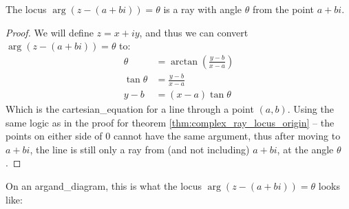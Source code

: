             \begin{theorem}
                The \gls{locus} $\arg (z-(a+bi))=\theta$ is a ray with angle $\theta$ from the point $a+bi$.
            \end{theorem}
            \begin{proof}
                We will define $z=x+iy$, and thus we can convert $\arg(z-(a+bi))=\theta$ to:
                \begin{equation*}
                    \begin{aligned}
                        \theta&=\arctan\left(\frac{y-b}{x-a}\right) \\
                        \tan\theta&=\frac{y-b}{x-a} \\
                        y-b&=(x-a)\tan\theta
                    \end{aligned}
                \end{equation*}
                Which is the \gls{cartesian_equation} for a line through a point $(a,b)$.
                Using the same logic as in the proof for theorem \ref{thm:complex_ray_locus_origin} -- the points on either side of $0$ cannot have the same \gls{argument}, thus after moving to $a+bi$, the line is still only a ray from (and not including) $a+bi$, at the angle $\theta$.
            \end{proof}

            On an \gls{argand_diagram}, this is what the \gls{locus} $\arg(z-(a+bi))=\theta$ looks like:

